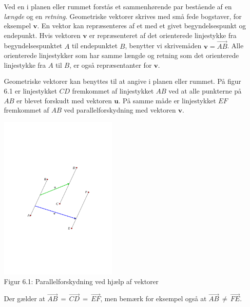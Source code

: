 Ved en  i planen eller rummet forstås et sammenhørende par bestående af en \textit{længde} og en \textit{retning}. Geometriske vektorer skrives med små fede bogstaver, for eksempel $\mathbf{v}$. En vektor kan repræsenteres af et  med et givet begyndelsespunkt og endepunkt. Hvis vektoren $\mathbf{v}$ er repræsenteret af det orienterede linjestykke fra begyndelsespunktet $A$ til endepunktet $B$, benytter vi skrivemåden $\mathbf{v}=\stackrel{\rightarrow}{AB}$. Alle orienterede linjestykker som har samme længde og retning som det orienterede linjestykke fra $A$ til $B$, er også repræsentanter for
$\textbf{v}$.
\begin{example}
Geometriske vektorer kan benyttes til at angive  i planen eller rummet. På figur 6.1 er linjestykket $CD$ fremkommet af linjestykket $AB$ ved at alle punkterne på $AB$ er blevet forskudt med vektoren $\mathbf{u}$. På samme måde er linjestykket $EF$ fremkommet af $AB$ ved parallelforskydning med vektoren $\mathbf{v}$.

\begin{center}
	\includegraphics[trim=4.2cm 8.5cm 4cm 8.7cm,width=0.44\textwidth,clip]{geometer/vektor1.pdf}\\

Figur 6.1: Parallelforskydning ved hjælp af vektorer				
\end{center}
Der gælder at $\stackrel{\rightarrow}{AB}\,=\,\stackrel{\rightarrow}{CD}\,=\,\stackrel{\rightarrow}{EF}$, men bemærk for eksempel også at 
$\stackrel{\rightarrow}{AB}\,\neq\,\stackrel{\rightarrow}{FE}$.
\end{example}


